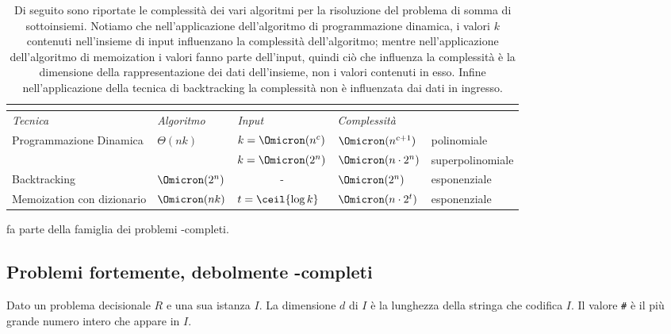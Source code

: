 \begin{table}[htbp]\centering
	\caption[Complessità di {\subSetSumProblem}]{Di seguito sono riportate le complessità dei vari algoritmi per la risoluzione del problema di somma di sottoinsiemi. Notiamo che nell'applicazione dell'algoritmo di programmazione dinamica, i valori \(k\) contenuti nell'insieme di input influenzano la complessità dell'algoritmo; mentre nell'applicazione dell'algoritmo di memoization i valori fanno parte dell'input, quindi ciò che influenza la complessità è la dimensione della rappresentazione dei dati dell'insieme, non i valori contenuti in esso. Infine nell'applicazione della tecnica di backtracking la complessità non è influenzata dai dati in ingresso.}
	\label{tab:subsetsum-complexity}
	\begin{tabular}{@{} *{5}{l} @{}}
		\toprule
			\multicolumn{5}{c}{{\subSetSumProblem}} \\
		\midrule
			\emph{Tecnica} & \emph{Algoritmo} & \emph{Input} & \emph{Complessità} & \\
		\midrule
			\multirow{2}{*}{Programmazione Dinamica} & \multirow{2}{*}{\(\Theta(nk)\)} & \(k = \Omicron(n^c)\) & \(\Omicron(n^{c+1})\) & polinomiale\\
		\addlinespace
			& & \(k = \Omicron(2^n)\) & \(\Omicron(n \cdot 2^n)\)  & superpolinomiale\\
		\lightrule
			Backtracking & \(\Omicron(2^n)\) & \multicolumn{1}{c}{-} & \(\Omicron(2^n)\) & esponenziale\\
		\lightrule
			Memoization con dizionario & \(\Omicron(nk)\) & \(t = \ceil{\log k}\) & \(\Omicron(n \cdot 2^t)\) & esponenziale\\
		\bottomrule
	\end{tabular}
\end{table}

{\subSetSumProblem} fa parte della famiglia dei problemi {\NP}-completi.

\newpage
\subsection{Problemi fortemente, debolmente {\NP}-completi}

\begin{definition}
Dato un problema decisionale \(R\) e una sua istanza \(I\).
La \alert{dimensione \(d\)} di \(I\) è la lunghezza della stringa che codifica \(I\).
Il \alert{valore \texttt{\#}} è il più grande numero intero che appare in \(I\).
\end{definition}

